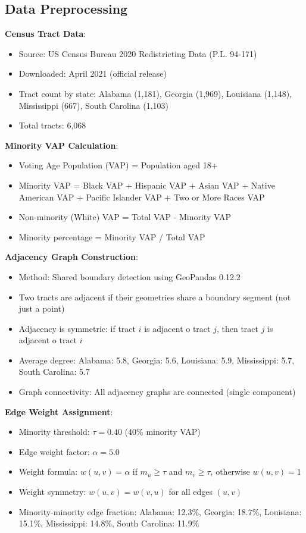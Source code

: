 \subsection{Data Preprocessing}

\textbf{Census Tract Data}:
\begin{itemize}
    \item Source: US Census Bureau 2020 Redistricting Data (P.L. 94-171)
    \item Downloaded: April 2021 (official release)
    \item Tract count by state: Alabama (1,181), Georgia (1,969), Louisiana (1,148), Mississippi (667), South Carolina (1,103)
    \item Total tracts: 6,068
\end{itemize}

\textbf{Minority VAP Calculation}:
\begin{itemize}
    \item Voting Age Population (VAP) = Population aged 18+
    \item Minority VAP = Black VAP + Hispanic VAP + Asian VAP + Native American VAP + Pacific Islander VAP + Two or More Races VAP
    \item Non-minority (White) VAP = Total VAP - Minority VAP
    \item Minority percentage = Minority VAP / Total VAP
\end{itemize}

\textbf{Adjacency Graph Construction}:
\begin{itemize}
    \item Method: Shared boundary detection using GeoPandas 0.12.2
    \item Two tracts are adjacent if their geometries share a boundary segment (not just a point)
    \item Adjacency is symmetric: if tract $i$ is adjacent 	o tract $j$, then tract $j$ is adjacent 	o tract $i$
    \item Average degree: Alabama: 5.8, Georgia: 5.6, Louisiana: 5.9, Mississippi: 5.7, South Carolina: 5.7
    \item Graph connectivity: All adjacency graphs are connected (single component)
\end{itemize}

\textbf{Edge Weight Assignment}:
\begin{itemize}
    \item Minority threshold: $\tau = 0.40$ (40\% minority VAP)
    \item Edge weight factor: $\alpha = 5.0$
    \item Weight formula: $w(u,v) = \alpha$ if $m_u \geq \tau$ and $m_v \geq \tau$, otherwise $w(u,v) = 1$
    \item Weight symmetry: $w(u,v) = w(v,u)$ for all edges $(u,v)$
    \item Minority-minority edge fraction: Alabama: 12.3\%, Georgia: 18.7\%, Louisiana: 15.1\%, Mississippi: 14.8\%, South Carolina: 11.9\%
\end{itemize}

